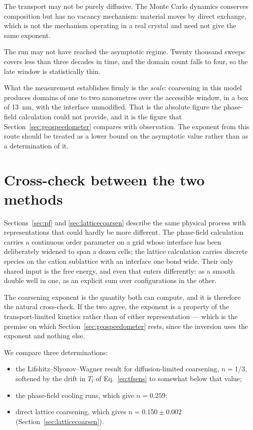 \documentclass[preprint,12pt,authoryear]{elsarticle}
\newcommand{\Tf}{T_{\mathrm{f}}}
\begin{document}
The transport may not be purely diffusive. The Monte Carlo dynamics conserves
composition but has no vacancy mechanism: material moves by direct exchange,
which is not the mechanism operating in a real crystal and need not give the
same exponent.

The run may not have reached the asymptotic regime. Twenty thousand sweeps
covers less than three decades in time, and the domain count falls to four, so
the late window is statistically thin.

What the measurement establishes firmly is the \emph{scale}: coarsening in this
model produces domains of one to two nanometres over the accessible window, in
a box of 13~nm, with the interface unmodified. That is the absolute figure the
phase-field calculation could not provide, and it is the figure that
Section~\ref{sec:geospeedometer} compares with observation. The exponent from
this route should be treated as a lower bound on the asymptotic value rather
than as a determination of it.

\section{Cross-check between the two methods}
\label{sec:crosscheck}

Sections~\ref{sec:pf} and \ref{sec:latticecoarsen} describe the same physical
process with representations that could hardly be more different. The
phase-field calculation carries a continuous order parameter on a grid whose
interface has been deliberately widened to span a dozen cells; the lattice
calculation carries discrete species on the cation sublattice with an interface
one bond wide. Their only shared input is the free energy, and even that enters
differently: as a smooth double well in one, as an explicit sum over
configurations in the other.

The coarsening exponent is the quantity both can compute, and it is therefore
the natural cross-check. If the two agree, the exponent is a property of the
transport-limited kinetics rather than of either representation --- which is the
premise on which Section~\ref{sec:geospeedometer} rests, since the inversion
uses the exponent and nothing else.

We compare three determinations:
\begin{itemize}\itemsep2pt
\item the Lifshitz--Slyozov--Wagner result for diffusion-limited coarsening,
      $n = 1/3$, softened by the drift in $\Tf$ of Eq.~\eqref{eq:tfsens} to
      somewhat below that value;
\item the phase-field cooling runs, which give $n = 0.259$;
\item direct lattice coarsening, which gives $n = 0.150 \pm 0.002$
      (Section~\ref{sec:latticecoarsen}).
\end{itemize}
\end{document}
